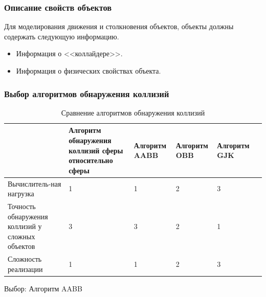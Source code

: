 \documentclass{beamer}
\begin{document}
\begin{frame}
\frametitle{Описание свойств объектов}
Для моделирования движения и столкновения объектов, объекты должны содержать следующую информацию.
\begin{itemize}
    \item<1-> Информация о <<коллайдере>>.
    \item<2-> Информация о физических свойствах объекта.
\end{itemize}

\end{frame}

\begin{frame}
\frametitle{Выбор алгоритмов обнаружения коллизий}
\begin{table}[H]
    \caption{Сравнение алгоритмов обнаружения коллизий}
    \label{tab:collisions}
\begin{adjustbox}{width=1\textwidth}
    \begin{tabular}{|p{}|p{}|p{}|p{}|p{}|p{}|}
        \hline
        &
        Алгоритм обнаружения коллизий сферы относительно сферы
        &
        Алгоритм AABB
        &
        Алгоритм OBB
        &
        Алгоритм GJK
        \\
        \hline
        Вычислитель-ная нагрузка
        &
        1 %
        &
        1 %
        &
        2 %
        &
        3 %
        \\
        \hline
        Точность обнаружения коллизий у сложных объектов
        &
        3 %
        &
        3 %
        &
        2 %
        &
        1 %
        \\
        \hline
        Сложность реализации
        &
        1 %
        &
        1 %
        &
        2 %
        &
        3 %
        \\
        \hline
    \end{tabular}
\end{adjustbox}
\end{table}
Выбор: Алгоритм AABB
\end{frame}
\end{document}
